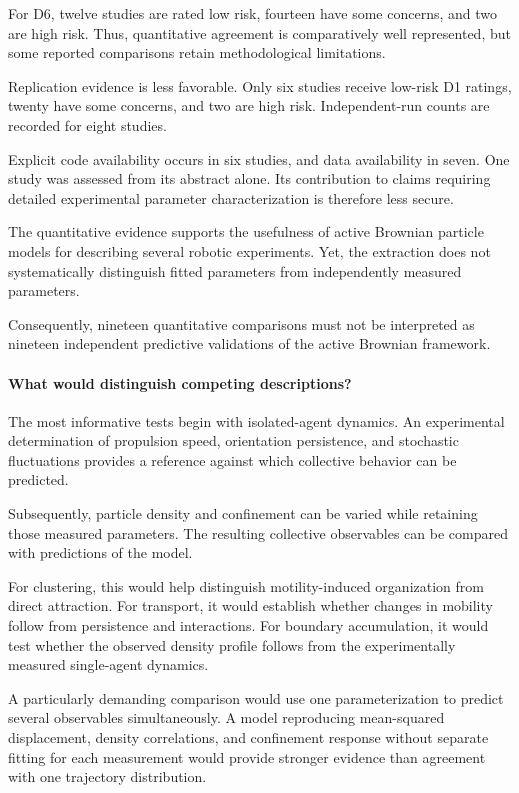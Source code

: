 For D6, twelve studies are
rated low risk, fourteen
have some concerns, and
two are high risk.
Thus, quantitative
agreement is comparatively
well represented, but
some reported comparisons
retain methodological
limitations.

Replication evidence is
less favorable. Only six
studies receive low-risk
D1 ratings, twenty have
some concerns, and two
are high risk. Independent-run
counts are recorded for
eight studies.

Explicit code availability
occurs in six studies,
and data availability
in seven. One study
was assessed from its
abstract alone. Its
contribution to claims
requiring detailed
experimental parameter
characterization is
therefore less secure.

The quantitative evidence
supports the usefulness
of active Brownian particle
models for describing
several robotic experiments.
Yet, the extraction does
not systematically
distinguish fitted
parameters from
independently measured
parameters.

Consequently, nineteen
quantitative comparisons
must not be interpreted
as nineteen independent
predictive validations
of the active Brownian
framework.

\paragraph*{What would distinguish competing descriptions?}

The most informative tests
begin with isolated-agent
dynamics. An experimental
determination of propulsion
speed, orientation persistence,
and stochastic fluctuations
provides a reference against
which collective behavior
can be predicted.

Subsequently, particle
density and confinement
can be varied while
retaining those measured
parameters. The resulting
collective observables
can be compared with
predictions of the model.

For clustering, this
would help distinguish
motility-induced
organization from
direct attraction.
For transport, it
would establish whether
changes in mobility
follow from persistence
and interactions.
For boundary accumulation,
it would test whether
the observed density
profile follows from
the experimentally
measured single-agent
dynamics.

A particularly demanding
comparison would use
one parameterization
to predict several
observables simultaneously.
A model reproducing
mean-squared displacement,
density correlations,
and confinement response
without separate fitting
for each measurement
would provide stronger
evidence than agreement
with one trajectory
distribution.

